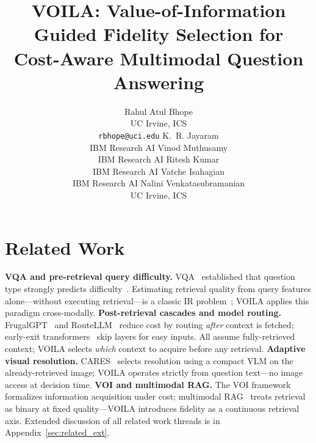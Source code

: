 \documentclass[11pt]{article}
\title{VOILA: Value-of-Information Guided Fidelity Selection for\\Cost-Aware Multimodal Question Answering}
\author{Rahul Atul Bhope \\
  UC Irvine, ICS \\
  \texttt{rbhope@uci.edu} \And
  K.~R. Jayaram \\
  IBM Research AI \And
  Vinod Muthusamy \\
  IBM Research AI \And
  Ritesh Kumar \\
  IBM Research AI \And
  Vatche Isahagian \\
  IBM Research AI \And
  Nalini Venkatasubramanian \\
  UC Irvine, ICS}
\theoremstyle{plain}
\theoremstyle{definition}
\theoremstyle{remark}
\newcommand{\fablenote}[1]{}
\begin{document}
\maketitle













\section{Related Work}\label{sec:related}

\noindent\textbf{VQA and pre-retrieval query difficulty.}
VQA~\cite{antol2015vqa,goyal2017vqav2,hudson2019gqa,singh2019textvqa} established that question type strongly predicts difficulty~\cite{kafle2017analysis,agrawal2018dont}.
Estimating retrieval quality from query features alone---without executing retrieval---is a classic IR problem~\cite{zhao2008predicting,hauff2008improved,mothe2005linguistic}; \textsc{VOILA} applies this paradigm cross-modally.
\textbf{Post-retrieval cascades and model routing.}
FrugalGPT~\cite{chen2023frugalgpt} and RouteLLM~\cite{wang2024routellm} reduce cost by routing \emph{after} context is fetched; early-exit transformers~\cite{zhou2020bert,schuster2022confident} skip layers for easy inputs.
All assume fully-retrieved context; \textsc{VOILA} selects \emph{which} context to acquire before any retrieval.
\textbf{Adaptive visual resolution.}
CARES~\cite{kimhi2025cares} selects resolution using a compact VLM on the already-retrieved image; \textsc{VOILA} operates strictly from question text---no image access at decision time.
\textbf{VOI and multimodal RAG.}
The VOI framework~\cite{bilgic2011value} formalizes information acquisition under cost; multimodal RAG~\cite{lewis2020rag,yasunaga2023retrievalaugmented,chen2022murag} treats retrieval as binary at fixed quality---\textsc{VOILA} introduces fidelity as a continuous retrieval axis.
Extended discussion of all related work threads is in Appendix~\ref{sec:related_ext}.
\fablenote{For AAAI, two gaps in related-work coverage: (1) cost-sensitive / active feature acquisition (e.g., Greiner et al.\ 2002; Shim et al.\ 2018 ``Joint Active Feature Acquisition and Classification'') --- this is the AAAI-native literature VOILA belongs to, and omitting it invites ``missing related work'' from exactly this venue's reviewers; (2) visual token compression / AnyRes-style adaptive resolution in modern VLMs (LLaVA-NeXT AnyRes, token-pruning work) --- distinct from VOILA (post-retrieval, image-dependent) but close enough that a reviewer will expect the distinction drawn explicitly. The IR query-difficulty thread, prominent in the EMNLP framing, can be compressed to one clause here to make room.}
\end{document}

